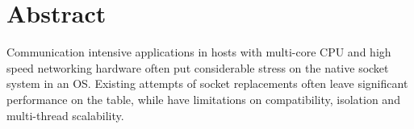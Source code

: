 \section*{Abstract}

Communication intensive applications in hosts with multi-core CPU and high speed networking hardware often put considerable stress on the native socket system in an OS. 
Existing attempts of socket replacements often leave significant performance on the table, while have limitations on compatibility, isolation and multi-thread scalability.



